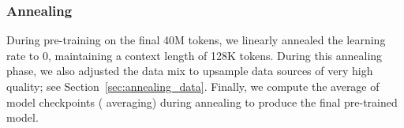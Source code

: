 \subsubsection{Annealing} 
\label{section:annealing}

During pre-training on the final 40M tokens, we linearly annealed the learning rate to 0, maintaining a context length of 128K tokens. During this annealing phase, we also adjusted the data mix to upsample data sources of very high quality; see Section~\ref{sec:annealing_data}. 
Finally, we compute the average of model checkpoints (\citet{polyak1991averaging} averaging) during annealing to produce the final pre-trained model.

